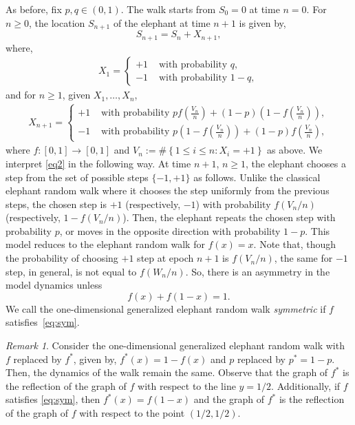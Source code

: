 \documentclass[12pt]{amsart}
\theoremstyle{plain}
\theoremstyle{remark}
\newtheorem{remark}[theorem]{Remark}
\numberwithin{equation}{section}
\begin{document}
As before, fix $p, q \in (0,1)$. The walk starts from $S_0 = 0$ at time $n = 0$. For $n\geq 0$, the location $S_{n+1}$ of the elephant at time $n+1$ is given by,
\[
    S_{n+1} = S_{n} + X_{n+1},
\]
where, %
\begin{align*}
           X_1 = \begin{cases}
               + 1 &\text{ with probability } q, \\ 
               - 1 &\text{ with probability } 1-q,
           \end{cases}
\end{align*}
and for $n \geq 1$, %
given $X_1, \ldots, X_n$,
\begin{align}\label{eq2}
           X_{n+1} = \begin{cases}
              + 1 &\text{ with probability } p{f\left(\frac{V_n}{n}\right)} + (1-p)\left(1-{f\left(\frac{V_n}{n}\right)}\right),\\ 
              - 1 &\text{ with probability } p\left(1-{f\left(\frac{V_n}{n}\right)}\right) + (1-p){f\left(\frac{V_n}{n}\right)},
           \end{cases}
\end{align}
where $f : [0,1] \to [0,1]$ and ${V_n} := \#\left\{1 \leq i \leq n : X_i = +1\right\}$ as above. We interpret \eqref{eq2} in the following way. At time $n + 1$, $n \geq 1$, the elephant chooses a step from the set of possible steps $\{-1,+1\}$ as follows. Unlike the classical elephant random walk where it chooses the step uniformly from the previous steps, the chosen step is $+1$ (respectively, $-1$) with probability $f(V_n/n)$ (respectively, $1 - f(V_n/n)$). Then, the elephant {repeats the chosen step with probability $p$, or moves in the opposite direction with probability $1-p$}. This model reduces to the elephant random walk for $f(x) = x$.  
Note that, though the probability of choosing $+1$ step at epoch $n+1$ is $f(V_n/n)$, the same for $-1$ step, in general, is not equal to $f(W_n/n)$. So, there is an asymmetry in the model dynamics unless 
\begin{equation}\label{eq:sym} f(x)+f(1-x) = 1.\end{equation} We call the one-dimensional generalized elephant random walk \emph{symmetric} if $f$ satisfies~\eqref{eq:sym}. 

\begin{remark}\label{rem:dual}
    Consider the one-dimensional generalized elephant random walk with $f$ replaced by $f^*$, given by, $f^*(x) = 1-f(x)$ and $p$ replaced by $p^* = 1-p$. Then, the dynamics of the walk remain the same. Observe that the graph of $f^*$ is the reflection of the graph of $f$ with respect to the line $y = 1/2$. Additionally, if $f$ satisfies \eqref{eq:sym}, then $f^*(x) = f(1-x)$ and the graph of $f^*$ is the reflection of the graph of $f$ with respect to the point $(1/2, 1/2)$.
\end{remark}
\end{document}

